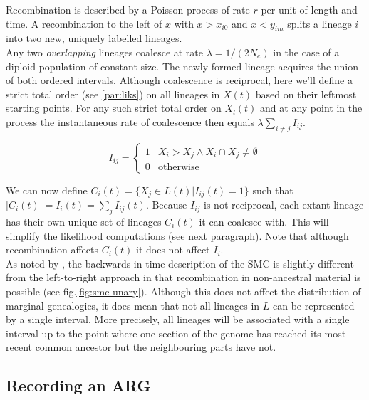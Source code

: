 \documentclass{article}
\begin{document}
Recombination is described by a Poisson process of rate $r$ per unit of length and time. 
A recombination to the 
left of $x$ with $x>x_{i0}$ and $x<y_{im}$ splits a lineage $i$ into two new, uniquely 
labelled lineages.\\

Any two \emph{overlapping} lineages coalesce at rate $\lambda = 1/(2N_e)$ in the case
of a diploid population of constant size. The newly formed lineage acquires the 
union of both ordered intervals.
Although coalescence is reciprocal, here we'll define a strict total order 
(see \ref{par:liks}) on 
all lineages in $X(t)$ based on their leftmost starting points. 
For any such strict total order on $X_l(t)$ and at any point in the process 
the instantaneous rate of coalescence then equals $\lambda \sum_{i \neq j} I_{ij}$.

\begin{equation} \label{def:coal}
I_{ij} = \begin{cases}
1 & X_i > X_j \wedge X_i \cap X_j \neq \emptyset \\
0 & \text{otherwise}
\end{cases}
\end{equation}

We can now define $C_i(t) = \{X_j \in L(t) | I_{ij}(t) = 1\}$ such that $|C_i(t)| = 
I_{i}(t) = \sum_{j} I_{ij}(t)$.
Because $I_{ij}$ is not reciprocal, each extant lineage has their own unique set of 
lineages $C_i(t)$ it can coalesce with. This will simplify the likelihood computations 
(see next paragraph). Note that although recombination affects $C_i(t)$ it does not 
affect $I_{i}$.\\ 

As noted by \cite{mcvean_approximating_2005}, the backwards-in-time description of the 
SMC is slightly different from the left-to-right approach in that recombination 
in non-ancestral material is possible (see fig.\ref{fig:smc-unary}). 
Although this does not affect the distribution 
of marginal genealogies, it does mean that not all lineages in $L$ can be represented 
by a single interval. More precisely, all lineages will be associated with 
a single interval up to the point where one section of the 
genome has reached its most recent common ancestor but the neighbouring parts have not.

\subsection{Recording an ARG} \label{par:recording}
\end{document}
